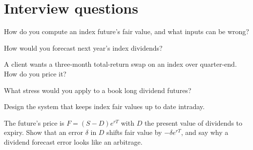 \section{Interview questions}

\begin{interviewq}\label{iq:s2:delta-one-and-dividends:1}
How do you compute an index future's fair value, and what inputs can be wrong?
\end{interviewq}

\begin{interviewq}\label{iq:s2:delta-one-and-dividends:2}
How would you forecast next year's index dividends?
\end{interviewq}

\begin{interviewq}\label{iq:s2:delta-one-and-dividends:3}
A client wants a three-month total-return swap on an index over quarter-end. How do you price it?
\end{interviewq}

\begin{interviewq}\label{iq:s2:delta-one-and-dividends:4}
What stress would you apply to a book long dividend futures?
\end{interviewq}

\begin{interviewq}\label{iq:s2:delta-one-and-dividends:5}
Design the system that keeps index fair values up to date intraday.
\end{interviewq}

\begin{interviewq}\label{iq:s2:delta-one-and-dividends:6}
The future's price is $F = (S - D) e^{rT}$ with $D$ the present value of dividends to expiry. Show that an error $\delta$ in $D$ shifts fair value by
$-\delta e^{rT}$, and say why a dividend forecast error looks like an arbitrage.
\end{interviewq}
